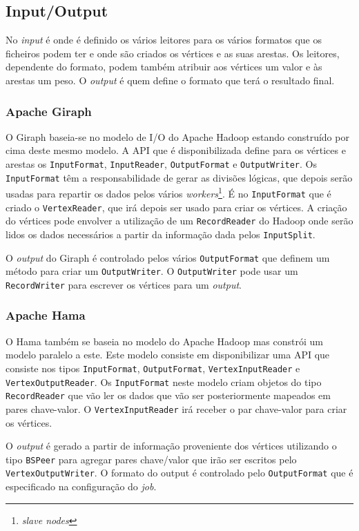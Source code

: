 \subsection{Input/Output}
No \textit{input} é onde é definido os vários leitores para os vários formatos que os ficheiros podem ter e onde são criados os vértices e as suas arestas. Os leitores, dependente do formato, podem também atribuir aos vértices um valor e às arestas um peso.
O \textit{output} é quem define	 o formato que terá o resultado final.
\subsubsection*{Apache Giraph}
O Giraph baseia-se no modelo de I/O do Apache Hadoop estando construído por cima deste mesmo modelo.
A API que é disponibilizada define para os vértices e arestas os \texttt{InputFormat}, \texttt{InputReader}, \texttt{OutputFormat} e \texttt{OutputWriter}.
Os \texttt{InputFormat} têm a responsabilidade de gerar as divisões lógicas, que depois serão usadas para repartir os dados pelos vários
\textit{workers}\footnote{\textit{slave nodes}}. É no \texttt{InputFormat} que é criado o \texttt{VertexReader}, que irá depois ser usado para criar os vértices.
A criação do vértices pode envolver a utilização de um \texttt{RecordReader} do Hadoop onde serão lidos os dados necessários a partir da informação dada pelos \texttt{InputSplit}.

O \textit{output} do Giraph é controlado pelos vários \texttt{OutputFormat} que definem um método para criar um \texttt{OutputWriter}. O \texttt{OutputWriter} pode usar um \texttt{RecordWriter}
para escrever os vértices para um \textit{output}.

\subsubsection*{Apache Hama}

O Hama também se baseia no modelo do Apache Hadoop mas constrói um modelo paralelo a este.
Este modelo consiste em disponibilizar uma API que consiste nos tipos \texttt{InputFormat}, \texttt{OutputFormat}, \texttt{VertexInputReader} e \texttt{VertexOutputReader}. Os \texttt{InputFormat} neste modelo criam objetos do tipo \texttt{RecordReader} 
que vão ler os dados que vão ser posteriormente mapeados em pares chave-valor. O \texttt{VertexInputReader} irá receber o par chave-valor para criar os
vértices.

O \textit{output} é gerado a partir de informação proveniente dos vértices utilizando o tipo \texttt{BSPeer} para agregar pares chave/valor que irão
ser escritos pelo \texttt{VertexOutputWriter}. O formato do output é controlado pelo \texttt{OutputFormat} que é especificado na
configuração do \textit{job}.

